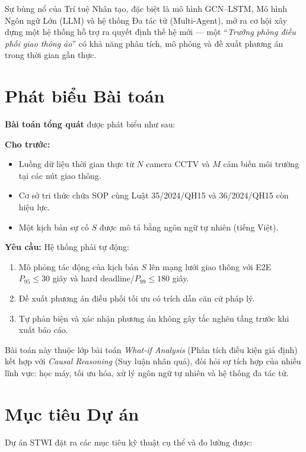 Sự bùng nổ của Trí tuệ Nhân tạo, đặc biệt là mô hình GCN--LSTM, Mô hình Ngôn ngữ Lớn (LLM) và hệ thống Đa tác tử (Multi-Agent), mở ra cơ hội xây dựng một hệ thống hỗ trợ ra quyết định thế hệ mới --- một ``\textit{Trưởng phòng điều phối giao thông ảo}'' có khả năng phân tích, mô phỏng và đề xuất phương án trong thời gian gần thực.

\section{Phát biểu Bài toán}

\textbf{Bài toán tổng quát} được phát biểu như sau:

\begin{tcolorbox}[notebox]
\textbf{Cho trước:}
\begin{itemize}[itemsep=2pt]
  \item Luồng dữ liệu thời gian thực từ $N$ camera CCTV và $M$ cảm biến môi trường tại các nút giao thông.
  \item Cơ sở tri thức chứa SOP cùng Luật 35/2024/QH15 và 36/2024/QH15 còn hiệu lực.
  \item Một kịch bản sự cố $S$ được mô tả bằng ngôn ngữ tự nhiên (tiếng Việt).
\end{itemize}

\textbf{Yêu cầu:} Hệ thống phải tự động:
\begin{enumerate}[itemsep=2pt]
  \item Mô phỏng tác động của kịch bản $S$ lên mạng lưới giao thông với E2E $P_{95}\leq30$ giây và hard deadline/$P_{99}\leq180$ giây.
  \item Đề xuất phương án điều phối tối ưu có trích dẫn căn cứ pháp lý.
  \item Tự phản biện và xác nhận phương án không gây tắc nghẽn tầng trước khi xuất báo cáo.
\end{enumerate}
\end{tcolorbox}

Bài toán này thuộc lớp bài toán \textit{What-if Analysis} (Phân tích điều kiện giả định) kết hợp với \textit{Causal Reasoning} (Suy luận nhân quả), đòi hỏi sự tích hợp của nhiều lĩnh vực: học máy, tối ưu hóa, xử lý ngôn ngữ tự nhiên và hệ thống đa tác tử.

\section{Mục tiêu Dự án}

Dự án STWI đặt ra các mục tiêu kỹ thuật cụ thể và đo lường được:

